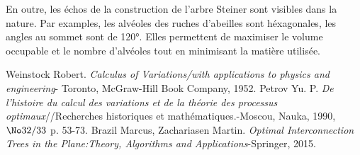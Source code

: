 \documentclass[10pt,a4paper]{article}%
\theoremstyle{theorem}
\theoremstyle{definition}
\begin{document}
	En outre, les échos de la construction de l'arbre Steiner sont visibles dans la nature. Par examples, les alvéoles des ruches d’abeilles sont héxagonales, les angles au sommet sont de 120°. Elles permettent de maximiser le volume occupable et le nombre
	d’alvéoles tout en minimisant la matière utilisée.
%	
%		
%		
%		 
		
		
		

	
	
		
		         
		         
		         
	        
	        
        
       
\begin{thebibliography}{9}
	 Weinstock Robert. \textit{Calculus of Variations/with applications to physics and engineering}- Toronto, McGraw-Hill Book Company, 1952.
	 Petrov Yu. P. \textit{De l'histoire du calcul des variations et de la théorie des processus optimaux}//Recherches historiques et mathématiques.-Moscou, Nauka, 1990, $\No 32/33$ p. 53-73.
	 Brazil Marcus, Zachariasen Martin. \textit{Optimal Interconnection Trees in the Plane:Theory, Algorithms and Applications}-Springer, 2015. 
\end{thebibliography}    
\end{document}
